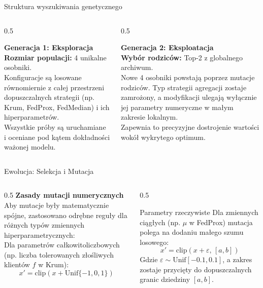 \documentclass[9pt,aspectratio=169]{beamer}
\begin{document}
\begin{frame}{Struktura wyszukiwania genetycznego}
\begin{columns}[T]
\begin{column}{0.5\textwidth}
\begin{cardpurple}
\textbf{Generacja 1: Eksploracja}\\[6pt]
\footnotesize \textbf{Rozmiar populacji:} 4 unikalne osobniki.\\[4pt]
Konfiguracje są losowane równomiernie z całej przestrzeni dopuszczalnych strategii (np. Krum, FedProx, FedMedian) i ich hiperparametrów.\\[4pt]
Wszystkie próby są uruchamiane i oceniane pod kątem dokładności ważonej modelu.
\end{cardpurple}
\end{column}
\begin{column}{0.5\textwidth}
\begin{cardgreen}
\textbf{Generacja 2: Eksploatacja}\\[6pt]
\footnotesize \textbf{Wybór rodziców:} Top-2 z globalnego archiwum.\\[4pt]
Nowe 4 osobniki powstają poprzez mutacje rodziców. Typ strategii agregacji zostaje zamrożony, a modyfikacji ulegają wyłącznie jej parametry numeryczne w małym zakresie lokalnym.\\[4pt]
Zapewnia to precyzyjne dostrojenie wartości wokół wykrytego optimum.
\end{cardgreen}
\end{column}
\end{columns}
\end{frame}

\begin{frame}{Ewolucja: Selekcja i Mutacja}
\begin{columns}[T]
\begin{column}{0.5\textwidth}
\textbf{Zasady mutacji numerycznych}\\[4pt]
Aby mutacje były matematycznie spójne, zastosowano odrębne reguły dla różnych typów zmiennych hiperparametrycznych:\\[6pt]
Dla parametrów całkowitoliczbowych (np. liczba tolerowanych złośliwych klientów $f$ w Krum):
\[
x' = \mathrm{clip}(x + \mathrm{Unif}\{-1,0,1\})
\]
\end{column}
\begin{column}{0.5\textwidth}
\begin{infobox}{Parametry rzeczywiste}
Dla zmiennych ciągłych (np. $\mu$ w FedProx) mutacja polega na dodaniu małego szumu losowego:
\[
x' = \mathrm{clip}(x+\varepsilon,\,[a,b])
\]
{\footnotesize Gdzie $\varepsilon\sim\mathrm{Unif}[-0.1,0.1]$, a zakres zostaje przycięty do dopuszczalnych granic dziedziny $[a,b]$.}
\end{infobox}
\end{column}
\end{columns}
\end{frame}
\end{document}
